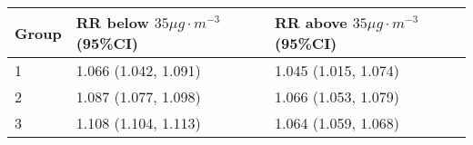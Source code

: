 \begin{tabular}{lll}
  \hline
Group & RR below $35 \mu g \cdot m^{-3}$ (95\%CI) & RR above $35 \mu g \cdot m^{-3}$ (95\%CI) \\ 
  \hline
   1 & 1.066 (1.042, 1.091) & 1.045 (1.015, 1.074) \\ 
     2 & 1.087 (1.077, 1.098) & 1.066 (1.053, 1.079) \\ 
     3 & 1.108 (1.104, 1.113) & 1.064 (1.059, 1.068) \\ 
   \hline
\end{tabular}

